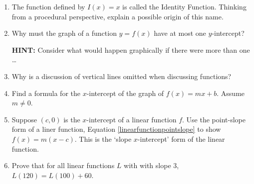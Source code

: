 \begin{enumerate}
\begin{center}
\end{center}

\setcounter{HW}{\value{enumi}}
\end{enumerate}


\begin{enumerate}
\setcounter{enumi}{\value{HW}}

\item \label{identityexercise} The function defined by $I(x) = x$ is called the  Identity Function.   Thinking from a procedural perspective, explain a possible origin of this name.

\item  \label{onlyoneyintexercise} Why must the graph of a function $y = f(x)$ have at most one $y$-intercept?  

\textbf{HINT:}  Consider what would happen graphically if there were more than one \ldots

\item  Why is a discussion of vertical lines omitted when discussing functions?

\item  \label{xinterceptoflinear} Find a formula for the $x$-intercept of the graph of $f(x) = mx + b$.  Assume $m \neq 0$.

\item  \label{xinterceptformoflinear} Suppose $(c,0)$ is the $x$-intercept of a linear function $f$.  Use the point-slope form of a liner function, Equation \ref{linearfunctionpointslope} to show $f(x) = m(x-c)$.  This is the `slope $x$-intercept' form of the linear function.

\item Prove that for all linear functions $L$ with with slope $3$, $L(120) = L(100) + 60$.

\setcounter{HW}{\value{enumi}}
\end{enumerate}


